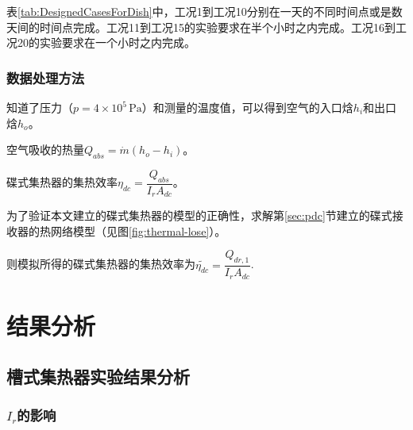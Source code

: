 表\ref{tab:DesignedCasesForDish}中，工况1到工况10分别在一天的不同时间点或是数天间的时间点完成。工况11到工况15的实验要求在半个小时之内完成。工况16到工况20的实验要求在一个小时之内完成。

\subsubsection{数据处理方法}
知道了压力（$p = 4\times10^5\,\mathrm{Pa}$）和测量的温度值，可以得到空气的入口焓$h_i$和出口焓$h_o$。

空气吸收的热量$Q_{abs} = \dot{m}(h_o - h_i)$。

碟式集热器的集热效率$\eta_{dc} = \dfrac{Q_{abs}}{I_r A_{dc}}$。

为了验证本文建立的碟式集热器的模型的正确性，求解第\ref{sec:pdc}节建立的碟式接收器的热网络模型（见图\ref{fig:thermal-lose}）。

则模拟所得的碟式集热器的集热效率为$\widetilde{\eta_{dc}} = \dfrac{Q_{dr,1}}{I_r A_{dc}}$.

\section{结果分析}
\subsection{槽式集热器实验结果分析}

\subsubsection{$I_r$的影响}

